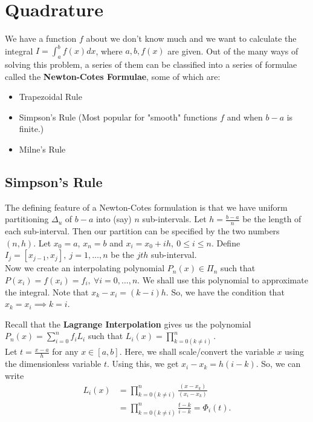 

\section{Quadrature}

We have a function $f$ about we don't know much and we want to calculate the integral 
$I = \int_a^b f(x) dx$, where  $a,b,f(x)$ are given. Out of the many ways of solving this 
problem, a series of them can be classified into a series of formulae called the 
\textbf{Newton-Cotes Formulae}, some of which are:
\begin{itemize}
    \item Trapezoidal Rule
    \item Simpson's Rule (Most popular for "smooth" functions $f$ and when  $b-a$ is finite.)
    \item Milne's Rule
\end{itemize}

\subsection{Simpson's Rule}

The defining feature of a Newton-Cotes formulation is that we have uniform partitioning 
$\Delta _u$ of  $b-a$ into (say)  $n$ sub-intervals. Let  $h = \frac{b-a}{n}$ be the length of
each sub-interval. Then our partition can be specified by the two numbers $(n,h)$. 
Let $x_0 = a$, $x_n = b$ and  $x_i = x_0 + ih,\ 0 \le  i \le  n$. 
Define $I_j = [x_{j-1}, x_j],\ j = 1,\ldots,n$ be the $jth$ sub-interval.
\\
Now we create an interpolating polynomial $P_n(x) \in \Pi _n$ such that  
$P(x_i) = f(x_i) = f_i,\ \forall i = 0,\ldots,n$. We shall use this polynomial to approximate
the integral.
Note that $x_k - x_i = (k-i)h$. So, we have the condition that $x_k = x_i \implies k = i$.

Recall that the \textbf{Lagrange Interpolation} gives us the polynomial 
$P_n(x) = \sum \limits _{i=0} ^n f_i L_i$ such that $L_i(x) = \prod \limits _{k=0 (k \neq i)} 
^ n$.
\\
Let $t = \frac{x-a}{h}$ for any $ x \in [a,b]$. Here, we shall scale/convert the variable $x$
using the dimensionless variable $t$. Using this, we get $x_i-x_k = h(i-k)$. So, we can write 
\begin{align*}
    L_i(x) &= \prod \limits _{k=0 (k \neq i)} ^n \frac{(x-x_k)}{(x_i - x_k)} \\
           &= \prod \limits _{k=0 (k \neq i)} ^n \frac{t-k}{i-k} = \Phi _i(t) 
.\end{align*}

